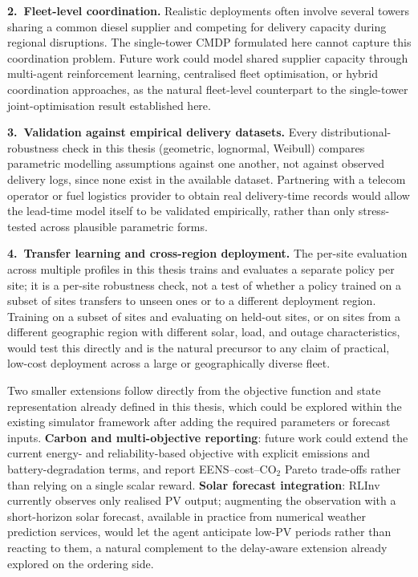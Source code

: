 \textbf{2.\ Fleet-level coordination.} Realistic
deployments often involve several towers sharing a common diesel
supplier and competing for delivery capacity during regional
disruptions. The single-tower CMDP formulated here cannot capture this
coordination problem. Future work could model shared supplier capacity
through multi-agent reinforcement learning, centralised fleet
optimisation, or hybrid coordination approaches, as the natural
fleet-level counterpart to the single-tower joint-optimisation result
established here.

\textbf{3.\ Validation against empirical delivery datasets.} Every
distributional-robustness check in this thesis (geometric, lognormal,
Weibull) compares parametric modelling assumptions against one another,
not against observed delivery logs, since none exist in the available
dataset. Partnering with a telecom operator or fuel logistics provider
to obtain real delivery-time records would allow the lead-time model
itself to be validated empirically, rather than only stress-tested
across plausible parametric forms.

\textbf{4.\ Transfer learning and cross-region deployment.} The
per-site evaluation across multiple profiles in this thesis trains and
evaluates a separate
policy per site; it is a per-site robustness check, not a test of
whether a policy trained on a subset of sites transfers to unseen ones
or to a different deployment region. Training on a subset of sites and
evaluating on held-out sites, or on sites from a different geographic
region with different solar, load, and outage characteristics, would
test this directly and is the natural precursor to any claim of
practical, low-cost deployment across a large or geographically diverse
fleet.

Two smaller extensions follow directly from the objective function and
state representation already defined in this thesis, which could be
explored within the existing simulator framework after adding the
required parameters or forecast inputs. \textbf{Carbon and multi-objective
reporting}: future work could extend the current energy- and
reliability-based objective with explicit emissions and
battery-degradation terms, and report EENS--cost--CO$_2$ Pareto
trade-offs rather than relying on a single scalar reward. \textbf{Solar forecast integration}: RLInv
currently observes only realised PV output; augmenting the observation
with a short-horizon solar forecast, available in practice from
numerical weather prediction services, would let the agent anticipate
low-PV periods rather than reacting to them, a natural complement to
the delay-aware extension already explored on the ordering side.

